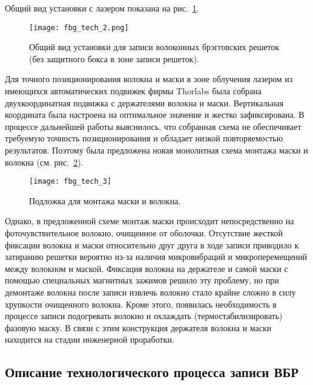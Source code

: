 Общий вид установки с лазером показана на рис.~\ref{img:fbg_tech_2}.
\begin{figure}[ht]
  \centering
  \texttt{[image: fbg\_tech\_2.png]}
  \caption{Общий вид установки для записи волоконных брэгговских решеток (без защитного бокса в зоне записи решеток).}
  \label{img:fbg_tech_2}
\end{figure}

Для точного позиционирования волокна и маски в зоне облучения лазером из имеющихся автоматических подвижек фирмы Thorlabs была собрана двухкоординатная подвижка с держателями волокна и маски. Вертикальная координата была настроена на оптимальное значение и жестко зафиксирована. В процессе дальнейшей работы выяснилось, что собранная схема не обеспечивает требуемую точность позиционирования и обладает низкой повторяемостью результатов. Поэтому была предложена новая монолитная схема монтажа маски и волокна (см. рис.~\ref{img:fbg_tech_3}).
\begin{figure}
  \centering
  \texttt{[image: fbg\_tech\_3]}
  \caption{Подложка для монтажа маски и волокна.}
  \label{img:fbg_tech_3}
\end{figure}

Однако, в предложенной схеме монтаж маски происходит непосредственно на фоточувствительное волокно, очищенное от оболочки. Отсутствие жесткой фиксации волокна и маски относительно друг друга в ходе записи приводило к затиранию решетки вероятно из-за наличия микровибраций и микроперемещений между волокном и маской. Фиксация волокна на держателе и самой маски с помощью специальных магнитных зажимов решило эту проблему, но при демонтаже волокна после записи извлечь волокно стало крайне сложно в силу хрупкости очищенного волокна. Кроме этого, появилась необходимость в процессе записи подогревать волокно и охлаждать (термостабилизировать) фазовую маску. В связи с этим конструкция держателя волокна и маски находится на стадии инженерной проработки.

\subsection{Описание технологического процесса записи ВБР}
\label{sub:fbg_exper_technology}

